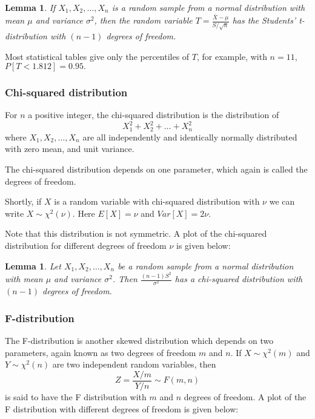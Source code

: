 \documentclass[12pt]{article}
\newtheorem{lemma}[theorem]{Lemma}
\begin{document}
\begin{lemma}
If $X_{1},X_{2},\ldots,X_{n}$ is a random sample from a normal distribution with mean $\mu$ and variance $\sigma^2$, then the random variable $\displaystyle T=\frac{\bar{X}-\mu}{S/\sqrt{n}}$ has the Students' t-distribution with $(n-1)$ degrees of freedom.
\end{lemma}
Most statistical tables give only the percentiles of $T$, for example, with $n=11$, $P[T<1.812]=0.95.$

\subsubsection{Chi-squared distribution}
For $n$ a positive integer, the chi-squared distribution is the distribution of
$$
X_{1}^{2}+X_{2}^{2}+\ldots+X_{n}^{2}
$$
where
$X_{1},X_{2},\ldots,X_{n}$ are all independently and identically normally distributed with zero mean, and unit variance.

The chi-squared distribution depends on one parameter, which again is called the degrees of freedom.

Shortly, if $X$ is a random variable with chi-squared distribution with $\nu$ we can write $X \sim \chi^{2}(\nu)$. Here $E[X]=\nu$ and $Var[X]=2\nu$.

Note that this distribution is not symmetric. A plot of the chi-squared distribution for different degrees of freedom $\nu$ is given below:




\begin{lemma}
Let $X_{1},X_{2},\ldots,X_{n}$ be a random sample from a normal distribution with mean $\mu$ and variance $\sigma^2$. Then $\displaystyle \frac{(n-1)S^{2}}{\sigma^{2}}$ has a chi-squared distribution with $(n-1)$ degrees of freedom.
\end{lemma}


\subsubsection{F-distribution}
The F-distribution is another skewed distribution which depends on two parameters, again known as two degrees of freedom $m$ and $n$. If $X \sim \chi^{2}(m)$ and $Y \sim \chi^{2}(n)$ are two independent random variables, then
$$
Z=\frac{X/m}{Y/n}\sim F(m,n)
$$
is said to have the F distribution with $m$ and $n$ degrees of freedom. A plot of the F distribution with different degrees of freedom  is given below:
\end{document}
